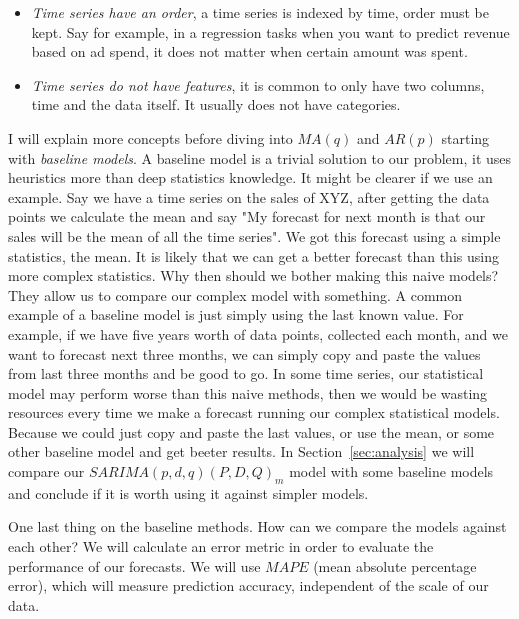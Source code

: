 \documentclass[journal]{IEEEtran}
\begin{document}
\begin{itemize}
    \item \emph{Time series have an order}, a time series is indexed by time,
        order must be kept. Say for example, in a regression tasks when  you
        want to predict revenue based on ad spend, it does not matter when
        certain amount was spent.

    \item \emph{Time series do not have features}, it is common to only have
        two columns, time and the data itself. It usually does not have
        categories.
\end{itemize}

I will explain more concepts before diving into $MA(q)$ and $AR(p)$ starting
with \emph{baseline models}. A baseline model is a trivial solution to our
problem, it uses heuristics more than deep statistics knowledge. It might be
clearer if we use an example. Say we have a time series on the sales of XYZ,
after getting the data points we calculate the mean and say "My forecast for
next month is that our sales will be the mean of all the time series". We got
this forecast using a simple statistics, the mean. It is likely that  we can
get a better forecast than this using more complex statistics. Why then should
we bother making this naive models? They allow us to compare our complex model
with something. A common example of a baseline model is just simply using the
last known value. For example, if we have five years worth of data points,
collected each month, and we want to forecast next three months, we can simply
copy and paste the values from last three months and be good to go. In some
time series, our statistical model may perform worse than this naive methods,
then we would be wasting resources every time we make a forecast running our
complex statistical models. Because we could just copy and paste the last
values, or use the mean, or some other baseline model and get beeter results.
In Section~\ref {sec:analysis} we will compare our $SARIMA(p,d,q)(P,D,Q)_m$
model with some baseline models and conclude if it is worth using it against
simpler models.

One last thing on the baseline methods. How can we compare the models against
each other? We will calculate an error metric in order to evaluate the
performance of our forecasts. We will use $MAPE$ (mean absolute percentage
error), which will measure prediction accuracy, independent of the scale of
our data.
\end{document}
